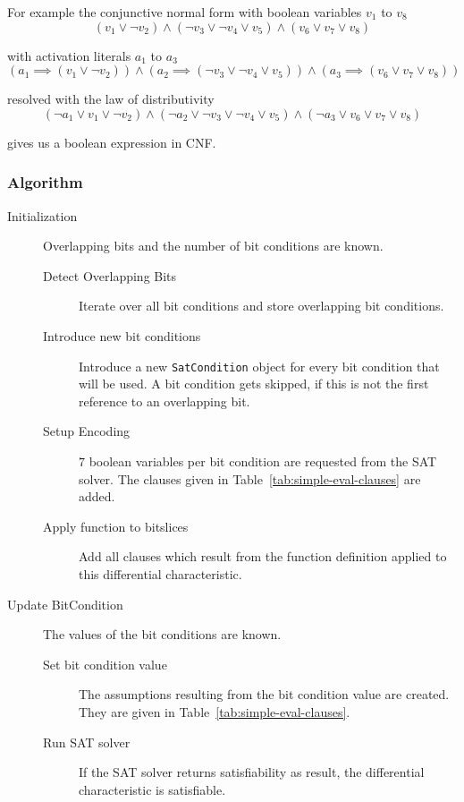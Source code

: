 For example the conjunctive normal form with boolean variables $v_1$ to $v_8$
%
\[
  (v_1 \lor \neg v_2) \land (\neg v_3 \lor \neg v_4 \lor v_5) \land
    (v_6 \lor v_7 \lor v_8)
\]

with activation literals $a_1$ to $a_3$
\[
  (a_1 \implies (v_1 \lor \neg v_2)) \land
    (a_2 \implies (\neg v_3 \lor \neg v_4 \lor v_5)) \land
    (a_3 \implies (v_6 \lor v_7 \lor v_8))
\]

resolved with the law of distributivity
\[
  (\neg a_1 \lor v_1 \lor \neg v_2) \land
    (\neg a_2 \lor \neg v_3 \lor \neg v_4 \lor v_5) \land
    (\neg a_3 \lor v_6 \lor v_7 \lor v_8)
\]

gives us a boolean expression in CNF.

\subsubsection{Algorithm}
\label{sec:activation-literals-algorithm}
%
\begin{description}
  \item[Initialization] Overlapping bits and the number of bit conditions are known.
    \begin{description}
      \item[Detect Overlapping Bits] Iterate over all bit conditions and store overlapping bit conditions.
      \item[Introduce new bit conditions] Introduce a new \texttt{SatCondition} object for every bit condition that will be used. A bit condition gets skipped, if this is not the first reference to an overlapping bit.
      \item[Setup Encoding] $7$ boolean variables per bit condition are requested from the SAT solver. The clauses given in Table~\ref{tab:simple-eval-clauses} are added.
      \item[Apply function to bitslices] Add all clauses which result from the function definition applied to this differential characteristic.
    \end{description}
  \item[Update BitCondition] The values of the bit conditions are known.
    \begin{description}
      \item[Set bit condition value] The assumptions resulting from the bit condition value are created. They are given in Table~\ref{tab:simple-eval-clauses}.
      \item[Run SAT solver] If the SAT solver returns satisfiability as result, the differential characteristic is satisfiable.
    \end{description}
\end{description}

